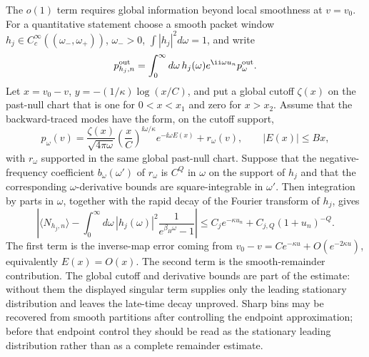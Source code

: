 \begin{controlledapproximation}
The \(o(1)\) term requires global information beyond local smoothness at
\(v=v_0\).  For a quantitative statement choose a smooth packet window
\(h_j\in C_c^\infty((\omega_-,\omega_+))\), \(\omega_->0\),
\(\int |h_j|^2d\omega=1\), and write
\[
  p_{h_j,n}^{\rm out}
  =
  \int_0^\infty d\omega\,
  h_j(\omega)e^{\ii\omega u_n}p_\omega^{\rm out}.
\]
Let \(x=v_0-v\), \(y=-(1/\kappa)\log(x/C)\), and put a global cutoff
\(\zeta(x)\) on the past-null chart that is one for \(0<x<x_1\) and zero for
\(x>x_2\).  Assume that the backward-traced modes have the form, on the
cutoff support,
\[
  p_\omega(v)
  =
  \frac{\zeta(x)}{\sqrt{4\pi\omega}}
  \left(\frac{x}{C}\right)^{\ii\omega/\kappa}
  e^{-\ii\omega E(x)}
  +r_\omega(v),
  \qquad |E(x)|\le Bx ,
\]
with \(r_\omega\) supported in the same global past-null chart.  Suppose that
the negative-frequency coefficient \(b_\omega(\omega')\) of \(r_\omega\) is
\(C^Q\) in \(\omega\) on the support of \(h_j\) and that the corresponding
\(\omega\)-derivative bounds are square-integrable in \(\omega'\).  Then
integration by parts in \(\omega\), together with the rapid decay of the
Fourier transform of \(h_j\), gives
\begin{equation}
  \left|
  \langle N_{h_j,n}\rangle
  -
  \int_0^\infty d\omega\,
  |h_j(\omega)|^2\frac{1}{e^{\beta_H\omega}-1}
  \right|
  \le
  C_j e^{-\kappa u_n}+C_{j,Q}(1+u_n)^{-Q}.
  \label{eq:hawking-late-time-packet-bound}
\end{equation}
The first term is the inverse-map error coming from
\(v_0-v=C e^{-\kappa u}+O(e^{-2\kappa u})\), equivalently
\(E(x)=O(x)\).  The second term is the smooth-remainder contribution.  The
global cutoff and derivative bounds are part of the estimate: without them the
displayed singular term supplies only the leading stationary distribution and
leaves the late-time decay unproved.  Sharp bins may be recovered from smooth
partitions after controlling the endpoint approximation; before that endpoint
control they should be read as the stationary leading distribution rather than
as a complete remainder estimate.
\end{controlledapproximation}

